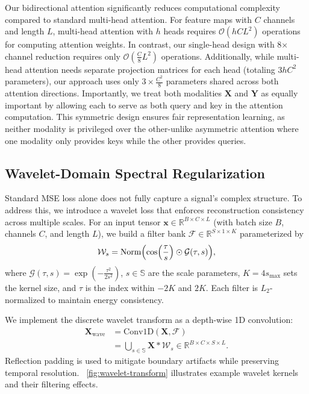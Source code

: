 \documentclass[conference]{IEEEtran}
\begin{document}
Our bidirectional attention significantly reduces computational complexity compared to standard multi-head attention. For feature maps with $C$ channels and length $L$, multi-head attention with $h$ heads requires $\mathcal{O}(hCL^2)$ operations for computing attention weights. In contrast, our single-head design with 8× channel reduction requires only $\mathcal{O}(\frac{C}{8}L^2)$ operations. Additionally, while multi-head attention needs separate projection matrices for each head (totaling $3hC^2$ parameters), our approach uses only $3 \times \frac{C^2}{8}$ parameters shared across both attention directions. Importantly, we treat both modalities $\mathbf{X}$ and $\mathbf{Y}$ as equally important by allowing each to serve as both query and key in the attention computation. This symmetric design ensures fair representation learning, as neither modality is privileged over the other-unlike asymmetric attention where one modality only provides keys while the other provides queries. 



\subsection{Wavelet-Domain Spectral Regularization}
\label{subsec:wavelet}

Standard MSE loss alone does not fully capture a signal's complex structure. To address this, we introduce a wavelet loss that enforces reconstruction consistency across multiple scales. For an input tensor $\mathbf{x}\in\mathbb{R}^{B\times C\times L}$ (with batch size $B$, channels $C$, and length $L$), we build a filter bank $\mathcal{F}\in\mathbb{R}^{S\times 1\times K}$ parameterized by
\begin{equation}
    \label{eq:wavelet}
    \mathcal{W}_s = \operatorname{Norm}\Bigl(\cos\Bigl(\frac{\tau}{s}\Bigr) \odot \mathcal{G}(\tau,s)\Bigr),
\end{equation}
where $\mathcal{G}(\tau,s)=\exp\left(-\frac{\tau^2}{2s^2}\right)$, $s\in\mathbb{S}$ are the scale parameters, $K=4s_{\text{max}}$ sets the kernel size, and $\tau$ is the index within $-2K$ and $2K$. Each filter is $L_2$-normalized to maintain energy consistency.

We implement the discrete wavelet transform as a depth-wise 1D convolution:
\begin{equation}
    \begin{aligned}
        \mathbf{X}_{\text{wave}} & = \text{Conv1D}(\mathbf{X}, \mathcal{F})                                                            \\
                                 & = \bigcup_{s\in\mathbb{S}} \mathbf{X}\ast \mathcal{W}_s \in \mathbb{R}^{B\times C\times S\times L}.
    \end{aligned}
\end{equation}
Reflection padding is used to mitigate boundary artifacts while preserving temporal resolution. \figurename~\ref{fig:wavelet-transform} illustrates example wavelet kernels and their filtering effects.
\end{document}
